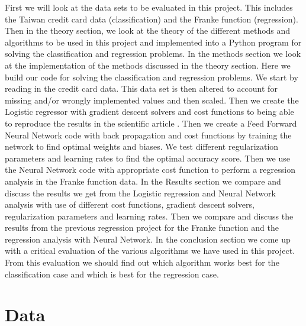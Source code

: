 \documentclass[12pt,a4paper,english]{article}
\begin{document}
First we will look at the data sets to be evaluated in this project. This includes the Taiwan credit card data (classification) and the Franke function (regression). Then in the theory section, we look at the theory of the different methods and algorithms to be used in this project and implemented into a Python program for solving the classification and regression problems. In the methods section we look at the implementation of the methods discussed in the theory section. Here we build our code for solving the classification and regression problems. We start by reading in the credit card data. This data set is then altered to account for missing and/or wrongly implemented values and then scaled. Then we create the Logistic regressor with gradient descent solvers and cost functions to being able to reproduce the results in the scientific article \cite{origarticle}. Then we create a Feed Forward Neural Network code with back propagation and cost functions by training the network to find optimal weights and biases. We test different regularization parameters and learning rates to find the optimal accuracy score. Then we use the Neural Network code with appropriate cost function to perform a regression analysis in the Franke function data. In the Results section we compare and discuss the results we get from the Logistic regression and Neural Network analysis with use of different cost functions, gradient descent solvers, regularization parameters  and learning rates. Then we compare and discuss the results from the previous regression project for the Franke function and the regression analysis with Neural Network. In the conclusion section we come up with a critical evaluation of the various algorithms we have used in this project. From this evaluation we should find out which algorithm works best for the classification case and which is best for the regression case.

\section{Data}
\label{sect:Data}
\end{document}
